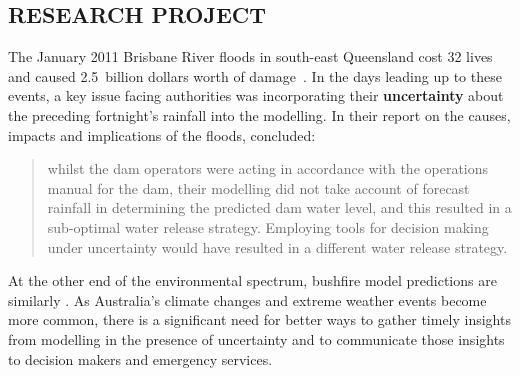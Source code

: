 \subsection*{RESEARCH PROJECT}

The January 2011 Brisbane River floods in south-east Queensland cost
32 lives and caused 2.5~billion dollars worth of
damage~\parencite{vandenhonert2011}. In the days leading up to
these events, a key issue facing authorities was incorporating their
\textbf{uncertainty} about the preceding fortnight's rainfall into the
modelling. In their report on the causes, impacts and implications of
the floods, \cite{vandenhonert2011} concluded:
\blockquote{whilst the dam operators were acting in accordance with
  the operations manual for the dam, their modelling did not take
  account of forecast rainfall in determining the predicted dam water
  level, and this resulted in a sub-optimal water release strategy.
  Employing tools for decision making under uncertainty would have
  resulted in a different water release strategy.} At the other end of
the environmental spectrum, bushfire model predictions are similarly
. As Australia's climate changes and extreme weather
events become more common, there is a significant need for better ways
to gather timely insights from modelling in the presence of
uncertainty and to communicate those insights to decision makers and
emergency services.

